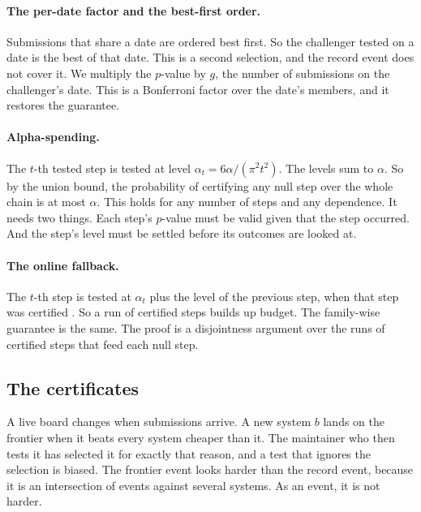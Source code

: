 \documentclass[11pt]{article}
\begin{document}
\paragraph{The per-date factor and the best-first order.} Submissions that share a date are ordered best first. So the challenger tested on a date is the best of that date. This is a second selection, and the record event does not cover it. We multiply the $p$-value by $g$, the number of submissions on the challenger's date. This is a Bonferroni factor over the date's members, and it restores the guarantee.

\paragraph{Alpha-spending.} The $t$-th tested step is tested at level $\alpha_t=6\alpha/(\pi^2t^2)$. The levels sum to $\alpha$. So by the union bound, the probability of certifying any null step over the whole chain is at most $\alpha$. This holds for any number of steps and any dependence. It needs two things. Each step's $p$-value must be valid given that the step occurred. And the step's level must be settled before its outcomes are looked at.

\paragraph{The online fallback.} The $t$-th step is tested at $\alpha_t$ plus the level of the previous step, when that step was certified \citep{wiens2003fallback,tian2021onlinefwer}. So a run of certified steps builds up budget. The family-wise guarantee is the same. The proof is a disjointness argument over the runs of certified steps that feed each null step.

\subsection{The certificates}
\label{sec:certify}
A live board changes when submissions arrive. A new system $b$ lands on the frontier when it beats every system cheaper than it. The maintainer who then tests it has selected it for exactly that reason, and a test that ignores the selection is biased. The frontier event looks harder than the record event, because it is an intersection of events against several systems. As an event, it is not harder.
\end{document}
